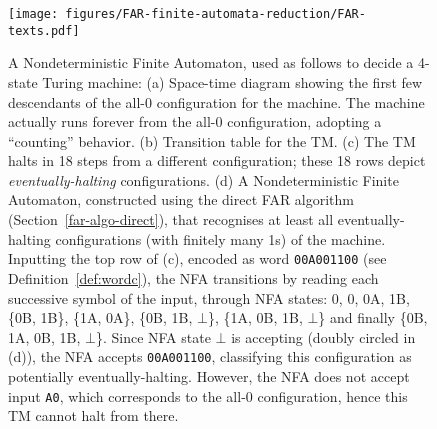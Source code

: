 \begin{figure}
    \centering
    \texttt{[image: figures/FAR-finite-automata-reduction/FAR-texts.pdf]}

    \caption{\small A Nondeterministic Finite Automaton, used as follows to decide a 4-state Turing machine\protect\footnotemark:
        (a) Space-time diagram showing the first few descendants of the all-0 configuration for the machine. The machine actually runs forever from the all-0 configuration, adopting a ``counting'' behavior.
        (b) Transition table for the TM.
        (c) The TM halts in 18 steps from a different configuration; these 18 rows depict \emph{eventually-halting} configurations.
        (d) A Nondeterministic Finite Automaton, constructed using the direct FAR algorithm (Section~\ref{far-algo-direct}), that recognises at least all eventually-halting configurations (with finitely many 1s) of the machine. Inputting the top row of (c), encoded as word \texttt{00A001100} (see Definition~\ref{def:wordc}), the NFA transitions by reading each successive symbol of the input, through NFA states: 0, 0, 0A, 1B, \{0B, 1B\}, \{1A, 0A\}, \{0B, 1B, $\bot$\}, \{1A, 0B, 1B, $\bot$\} and finally \{0B, 1A, 0B, 1B, $\bot$\}. Since NFA state $\bot$ is accepting (doubly circled in (d)), the NFA accepts \texttt{00A001100}, classifying this configuration as potentially eventually-halting. However, the NFA does not accept input \texttt{A0}, which corresponds to the all-0 configuration, hence this TM cannot halt from there.}



    \label{fig:finite-automata-reduction}
\end{figure}

